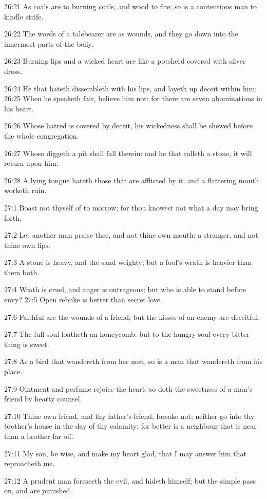 26:21 As coals are to burning coals, and wood to fire; so is a contentious man to kindle strife.

26:22 The words of a talebearer are as wounds, and they go down into the innermost parts of the belly.

26:23 Burning lips and a wicked heart are like a potsherd covered with silver dross.

26:24 He that hateth dissembleth with his lips, and layeth up deceit within him; 26:25 When he speaketh fair, believe him not: for there are seven abominations in his heart.

26:26 Whose hatred is covered by deceit, his wickedness shall be shewed before the whole congregation.

26:27 Whoso diggeth a pit shall fall therein: and he that rolleth a stone, it will return upon him.

26:28 A lying tongue hateth those that are afflicted by it; and a flattering mouth worketh ruin.

27:1 Boast not thyself of to morrow; for thou knowest not what a day may bring forth.

27:2 Let another man praise thee, and not thine own mouth; a stranger, and not thine own lips.

27:3 A stone is heavy, and the sand weighty; but a fool's wrath is heavier than them both.

27:4 Wrath is cruel, and anger is outrageous; but who is able to stand before envy?  27:5 Open rebuke is better than secret love.

27:6 Faithful are the wounds of a friend; but the kisses of an enemy are deceitful.

27:7 The full soul loatheth an honeycomb; but to the hungry soul every bitter thing is sweet.

27:8 As a bird that wandereth from her nest, so is a man that wandereth from his place.

27:9 Ointment and perfume rejoice the heart: so doth the sweetness of a man's friend by hearty counsel.

27:10 Thine own friend, and thy father's friend, forsake not; neither go into thy brother's house in the day of thy calamity: for better is a neighbour that is near than a brother far off.

27:11 My son, be wise, and make my heart glad, that I may answer him that reproacheth me.

27:12 A prudent man foreseeth the evil, and hideth himself; but the simple pass on, and are punished.

